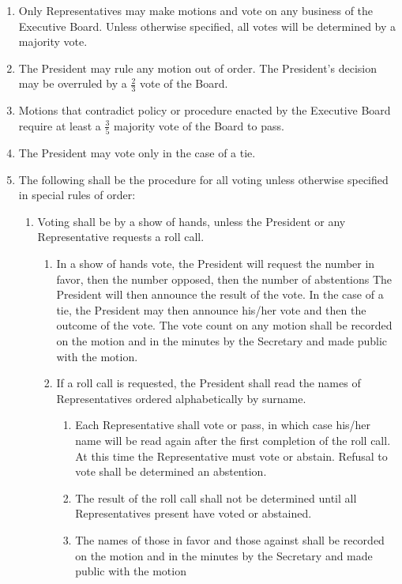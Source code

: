
\begin{enumerate}

\item Only Representatives may make motions and vote on any business of the Executive Board. Unless otherwise specified, all votes will be determined by a majority vote.

\item The President may rule any motion out of order. The President’s decision may be overruled by a $\frac{2}{3}$ vote of the Board.

\item Motions that contradict policy or procedure enacted by the Executive Board require at least a $\frac{3}{5}$ majority vote of the Board to pass.

\item The President may vote only in the case of a tie.

\item The following shall be the procedure for all voting unless otherwise specified in special rules of order:
\begin{enumerate}
    \item Voting shall be by a show of hands, unless the President or any Representative requests a roll call.
    \begin{enumerate}
        \item In a show of hands vote, the President will request the number in favor, then the number opposed, then the number of abstentions The President will then announce the result of the vote. In the case of a tie, the President may then announce his/her vote and then the outcome of the vote. The vote count on any motion shall be recorded on the motion and in the minutes by the Secretary and made public with the motion.
        \item If a roll call is requested, the President shall read the names of Representatives ordered alphabetically by surname.
        \begin{enumerate}
            \item Each Representative shall vote or pass, in which case his/her name will be read again after the first completion of the roll call. At this time the Representative must vote or abstain. Refusal to vote shall be determined an abstention.
            \item The result of the roll call shall not be determined until all Representatives present have voted or abstained.
            \item The names of those in favor and those against shall be recorded on the motion and in the minutes by the Secretary and made public with the motion
        \end{enumerate}
    \end{enumerate}
\end{enumerate}

\end{enumerate}
